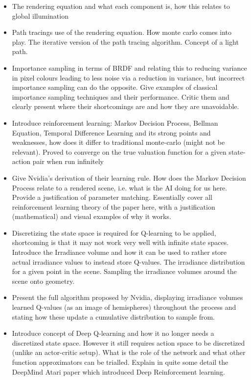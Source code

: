 \documentclass[ %
                    author={Callum Pearce},
                supervisor={Dr. Neill Campbell},
                    degree={MEng},
                     title={How effective are Temporal difference learning methods for reducing the number of zero contribution light paths while still accurately approximating Global Illumination in Path tracing?},
                  subtitle={},
                      type={research},
                      year={2019} ]{dissertation}
\begin{document}
\begin{itemize}
\item The rendering equation and what each component is, how this relates to global illumination

\item Path tracings use of the rendering equation. How monte carlo comes into play. The iterative version of the path tracing algorithm. Concept of a light path.

\item Importance sampling in terms of BRDF and relating this to reducing variance in pixel colours leading to less noise via a reduction in variance, but incorrect importance sampling can do the opposite. Give examples of classical importance sampling techniques and their performance. Critic them and clearly present where their shortcomings are and how they are unavoidable.

\item Introduce reinforcement learning: Markov Decision Process, Bellman 
Equation, Temporal Difference Learning and its strong points and weaknesses,
 how does it differ to traditional monte-carlo (might not be relevant). Proved 
 to converge on the true valuation function for a given state-action pair when 
 run infinitely
 
 \item Give Nvidia's derivation of their learning rule. How does the Markov Decision Process relate to a rendered scene, i.e. what is the AI doing for us here. Provide a justification of parameter matching. Essentially cover all reinforcement learning theory of the paper here, with a justification (mathematical) and visual examples of why it works. 
 
 \item Discretizing the state space is required for Q-learning to be applied, shortcoming is that it may not work very well with infinite state spaces. Introduce the Irradiance volume and how it can be used to rather store actual irradiance values to instead store Q-values. The irradiance distribution for a given point in the scene. Sampling the irradiance volumes around the scene onto geometry. 
 
 \item Present the full algorithm proposed by Nvidia, displaying irradiance volumes learned Q-values (as an image of hemispheres) throughout the process and stating how these update a cumulative distribution to sample from.
 
 \item Introduce concept of Deep Q-learning and how it no longer needs a discretized state space. However it still requires action space to be discretized (unlike an actor-critic setup). What is the role of the network and what other function approximators can be trialled. Explain in quite some detail the DeepMind Atari paper which introduced Deep Reinforcement learning.
 
\end{itemize}
\end{document}
